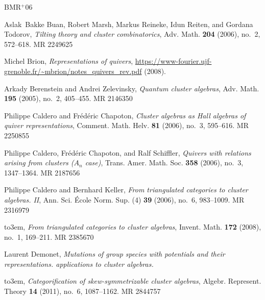 \documentclass[12pt]{amsart}
\begin{document}
\newcommand{\etalchar}[1]{$^{#1}$}
\providecommand{\bysame}{\leavevmode\hbox to3em{\hrulefill}\thinspace}
\providecommand{\MR}{\relax\ifhmode\unskip\space\fi MR }
\providecommand{\MRhref}[2]{%
  \href{http://www.ams.org/mathscinet-getitem?mr=#1}{#2}
}
\providecommand{\href}[2]{#2}
\begin{thebibliography}{BMR{\etalchar{+}}06}

\bibitem[BMR{\etalchar{+}}06]{buan-marsh-reineke-reiten-todorov}
Aslak~Bakke Buan, Robert Marsh, Markus Reineke, Idun Reiten, and Gordana
  Todorov, \emph{Tilting theory and cluster combinatorics}, Adv. Math.
  \textbf{204} (2006), no.~2, 572--618. \MR{2249625}

Michel Brion, \emph{Representations of quivers},
\url{https://www-fourier.ujf-grenoble.fr/~mbrion/notes_quivers_rev.pdf} (2008).

Arkady Berenstein and Andrei Zelevinsky, \emph{Quantum cluster algebras}, Adv.
  Math. \textbf{195} (2005), no.~2, 405--455. \MR{2146350}

Philippe Caldero and Fr\'ed\'eric Chapoton, \emph{Cluster algebras as {H}all
  algebras of quiver representations}, Comment. Math. Helv. \textbf{81} (2006),
  no.~3, 595--616. \MR{2250855}

Philippe Caldero, Fr\'ed\'eric Chapoton, and Ralf Schiffler, \emph{Quivers with
  relations arising from clusters ({$A_n$} case)}, Trans. Amer. Math. Soc.
  \textbf{358} (2006), no.~3, 1347--1364. \MR{2187656}

Philippe Caldero and Bernhard Keller, \emph{From triangulated categories to
  cluster algebras. {II}}, Ann. Sci. \'Ecole Norm. Sup. (4) \textbf{39} (2006),
  no.~6, 983--1009. \MR{2316979}

\bysame, \emph{From triangulated categories to cluster algebras}, Invent. Math.
  \textbf{172} (2008), no.~1, 169--211. \MR{2385670}

Laurent Demonet, \emph{Mutations of group species with potentials and their
  representations. applications to cluster algebras.}

\bysame, \emph{Categorification of skew-symmetrizable cluster algebras},
  Algebr. Represent. Theory \textbf{14} (2011), no.~6, 1087--1162. \MR{2844757}


\end{thebibliography}
\end{document}
